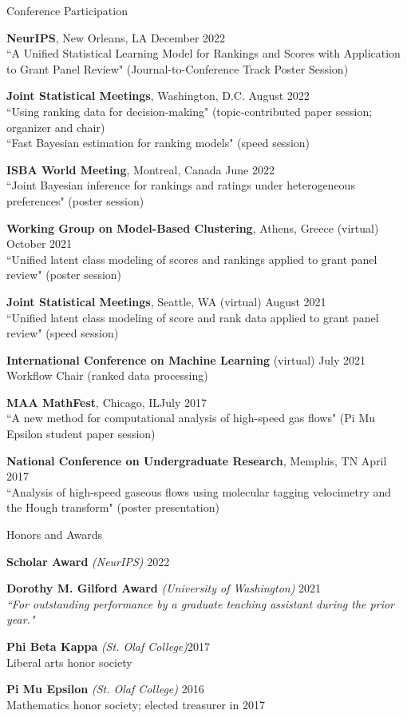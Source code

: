 \documentclass{resume} %
\begin{document}
\begin{rSection}{Conference Participation}

\textbf{NeurIPS}, New Orleans, LA \hfill {December 2022}\\
``A Unified Statistical Learning Model for Rankings and Scores with Application to Grant Panel Review" (Journal-to-Conference Track Poster Session)

\textbf{Joint Statistical Meetings}, Washington, D.C. \hfill {August 2022}\\
``Using ranking data for decision-making" (topic-contributed paper session; organizer and chair)\\
``Fast Bayesian estimation for ranking models" (speed session)

\textbf{ISBA World Meeting}, Montreal, Canada \hfill {June 2022}\\
``Joint Bayesian inference for rankings and ratings under heterogeneous preferences" (poster session)

\textbf{Working Group on Model-Based Clustering}, Athens, Greece (virtual)  \hfill {October 2021}\\
``Unified latent class modeling of scores and rankings applied to grant panel review" (poster session)

\textbf{Joint Statistical Meetings}, Seattle, WA (virtual) \hfill {August 2021}\\
``Unified latent class modeling of score and rank data applied to grant panel review" (speed session)

\textbf{International Conference on Machine Learning} (virtual) \hfill {July 2021}\\
Workflow Chair (ranked data processing)

\textbf{MAA MathFest}, Chicago, IL\hfill {July 2017}\\
``A new method for computational analysis of high-speed gas flows" (Pi Mu Epsilon student paper session)

\textbf{National Conference on Undergraduate Research}, Memphis, TN \hfill {April 2017}\\
``Analysis of high-speed gaseous flows using molecular tagging velocimetry and the Hough transform" (poster presentation)
\end{rSection}

\newpage
\begin{rSection}{Honors and Awards}

\textbf{Scholar Award} {\it (NeurIPS)} \hfill {2022}

\textbf{Dorothy M. Gilford Award} {\it (University of Washington)} \hfill {2021}
\\ {\it ``For outstanding performance by a graduate teaching assistant during the prior year."}

\textbf{Phi Beta Kappa} {\it (St. Olaf College)}\hfill {2017}
\\ Liberal arts honor society

\textbf{Pi Mu Epsilon} {\it (St. Olaf College)} \hfill {2016}
\\ Mathematics honor society; elected treasurer in 2017

\end{rSection}
\end{document}
